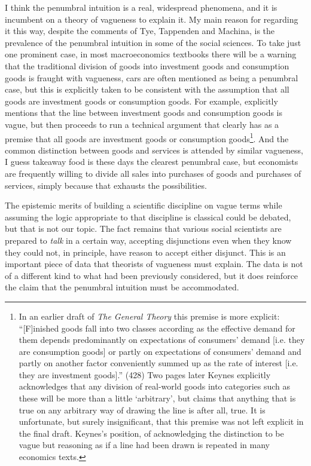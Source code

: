 I think the penumbral intuition is a real, widespread phenomena, and it is incumbent on a theory of vagueness to explain it. My main reason for regarding it this way, despite the comments of Tye, Tappenden and Machina, is the prevalence of the penumbral intuition in some of the social sciences. To take just one prominent case, in most macroeconomics textbooks there will be a warning that the traditional division of goods into investment goods and consumption goods is fraught with vagueness, cars are often mentioned as being a penumbral case, but this is explicitly taken to be consistent with the assumption that all goods are investment goods or consumption goods. For example, \cite[59-63]{Keynes1936} explicitly mentions that the line between investment goods and consumption goods is vague, but then proceeds to run a technical argument that clearly has as a premise that all goods are investment goods or consumption goods\footnote{In an earlier draft of \textit{The General Theory} \citep{Keynes1934} this premise is more explicit: ``[F]inished goods fall into two classes according as the effective demand for them depends predominantly on expectations of consumers' demand [i.e. they are consumption goods] or partly on expectations of consumers' demand and partly on another factor conveniently summed up as the rate of interest [i.e. they are investment goods].'' (428) Two pages later Keynes explicitly acknowledges that any division of real-world goods into categories such as these will be more than a little `arbitrary', but claims that anything that is true on any arbitrary way of drawing the line is after all, true. It is unfortunate, but surely insignificant, that this premise was not left explicit in the final draft. Keynes's position, of acknowledging the distinction to be vague but reasoning as if a line had been drawn is repeated in many economics texts.}. And the common distinction between goods and services is attended by similar vagueness, I guess takeaway food is these days the clearest penumbral case, but economists are frequently willing to divide all sales into purchases of goods and purchases of services, simply because that exhausts the possibilities. 

The epistemic merits of building a scientific discipline on vague terms while assuming the logic appropriate to that discipline is classical could be debated, but that is not our topic. The fact remains that various social scientists are prepared to \textit{talk} in a certain way, accepting disjunctions even when they know they could not, in principle, have reason to accept either disjunct. This is an important piece of data that theorists of vagueness must explain. The data is not of a different kind to what had been previously considered, but it does reinforce the claim that the penumbral intuition must be accommodated.

